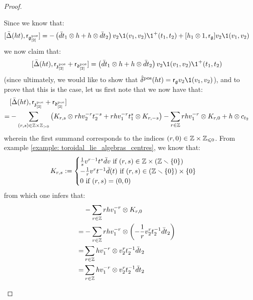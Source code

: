\begin{proof}
\begin{enumerate}
                    Since we know that:
                        $$[\bar{\Delta}(ht), \sfr_{\g_{[2]}^{\positive}}] = -\left( \bar{d}t_1 \tensor h + h \tensor \bar{d}t_2 \right) v_2 \1(v_1, v_2) \1^+(t_1, t_2) + [h_1 \tensor 1, \sfr_{\g}] v_2 \1(v_1, v_2)$$
                    we now claim that:
                        $$[\bar{\Delta}(ht), \sfr_{\z_{[2]}^{\positive}} + \sfr_{\d_{[2]}^{\positive}}] = \left( \bar{d}t_1 \tensor h + h \tensor \bar{d}t_2 \right) v_2 \1(v_1, v_2) \1^+(t_1, t_2)$$
                    (since ultimately, we would like to show that $\hat{\delta}^{\positive}(ht) = \sfr_{\g} v_2 \1(v_1, v_2)$), and to prove that this is the case, let us first note that we now have that:
                        $$
                            \begin{aligned}
                                & [\bar{\Delta}(ht), \sfr_{\z_{[2]}^{\positive}} + \sfr_{\d_{[2]}^{\positive}}]
                                \\
                                = & -\sum_{(r, s) \in \Z \x \Z_{> 0}} \left( K_{r, s} \tensor r h v_2^{-r} t_2^{-s} + r h v_1^{-r} t_1^s \tensor K_{r, -s} \right) - \sum_{r \in \Z} r h v_1^{-r} \tensor K_{r, 0} + h \tensor c_{t_2}
                            \end{aligned}
                        $$
                    wherein the first summand corresponds to the indices $(r, 0) \in \Z \x \Z_{\leq 0}$. From example \ref{example: toroidal_lie_algebras_centres}, we know that:
                        $$
                            K_{r, s} :=
                            \begin{cases}
                                \text{$\frac1s v^{r - 1} t^s \bar{d}v$ if $(r, s) \in \Z \x (\Z \setminus \{0\})$}
                                \\
                                \text{$-\frac1r v^r t^{-1} \bar{d}(t)$ if $(r, s) \in (\Z \setminus \{0\}) \x \{0\}$}
                                \\
                                \text{$0$ if $(r, s) = (0, 0)$}
                            \end{cases}
                        $$
                    from which one infers that:
                        $$
                            \begin{aligned}
                                & -\sum_{r \in \Z} r h v_1^{-r} \tensor K_{r, 0}
                                \\
                                = & -\sum_{r \in \Z} r h v_1^{-r} \tensor \left( -\frac1r v_2^r t_2^{-1} \bar{d}t_2 \right)
                                \\
                                = & \sum_{r \in \Z} h v_1^{-r} \tensor v_2^r t_2^{-1} \bar{d}t_2
                                \\
                                = & \sum_{r \in \Z} h v_1^{-r} \tensor v_2^r t_2^{-1} \bar{d}t_2
                            \end{aligned}
                        $$
                        

\end{enumerate}
\end{proof}
